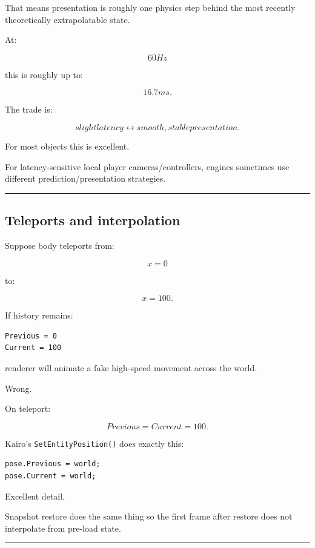 That means presentation is roughly one physics step behind the most recently theoretically extrapolatable state.

At:

\[
60Hz
\]

this is roughly up to:

\[
16.7ms.
\]

The trade is:

\[
\boxed{
slight latency
\leftrightarrow
smooth, stable presentation.
}
\]

For most objects this is excellent.

For latency-sensitive local player cameras/controllers, engines sometimes use different prediction/presentation strategies.

\begin{center}\rule{0.5\linewidth}{0.5pt}\end{center}

\subsection{Teleports and interpolation}\label{06-engine-ii-ch037-teleports-and-interpolation}

Suppose body teleports from:

\[
x=0
\]

to:

\[
x=100.
\]

If history remains:

\begin{verbatim}
Previous = 0
Current = 100
\end{verbatim}

renderer will animate a fake high-speed movement across the world.

Wrong.

On teleport:

\[
Previous=Current=100.
\]

Kairo's \texttt{SetEntityPosition()} does exactly this:

\begin{verbatim}
pose.Previous = world;
pose.Current = world;
\end{verbatim}

Excellent detail.

Snapshot restore does the same thing so the first frame after restore does not interpolate from pre-load state.

\begin{center}\rule{0.5\linewidth}{0.5pt}\end{center}

